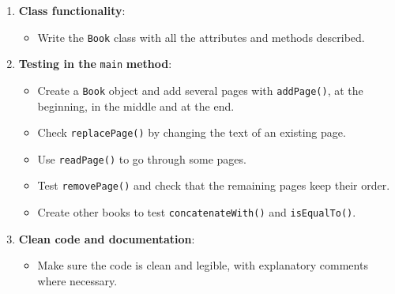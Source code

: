\begin{enumerate}

    \item \textbf{Class functionality}:

        \begin{itemize}

            \item Write the \texttt{Book} class with all the attributes and methods described.

        \end{itemize}

    \item \textbf{Testing in the} \texttt{main} \textbf{method}:

        \begin{itemize}

            \item Create a \texttt{Book} object and add several pages with \texttt{addPage()}, at the beginning, in the middle and at the end.

            \item Check \texttt{replacePage()} by changing the text of an existing page.

            \item Use \texttt{readPage()} to go through some pages.

            \item Test \texttt{removePage()} and check that the remaining pages keep their order.

            \item Create other books to test \texttt{concatenateWith()} and \texttt{isEqualTo()}.

        \end{itemize}

    \item \textbf{Clean code and documentation}:

        \begin{itemize}

            \item Make sure the code is clean and legible, with explanatory comments where necessary.

        \end{itemize}

\end{enumerate}
